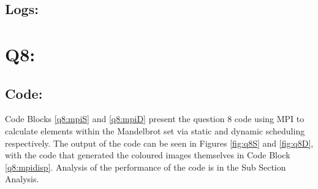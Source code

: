 \documentclass[11pt]{article}
\begin{document}
\subsection*{Logs:}



% 

\section*{Q8:}

\subsection*{Code:}
Code Blocks \ref{q8:mpiS} and \ref{q8:mpiD} present the question 8 code using MPI to calculate elements within the Mandelbrot set via static and dynamic scheduling respectively.
The output of the code can be seen in Figures \ref{fig:q8S} and \ref{fig:q8D}, with the code that generated the coloured images themselves in Code Block \ref{q8:mpidisp}.
Analysis of the performance of the code is in the Sub Section Analysis.



\end{document}
